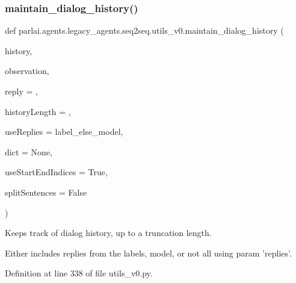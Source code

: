 \subsubsection{\texorpdfstring{maintain\+\_\+dialog\+\_\+history()}{maintain\_dialog\_history()}}
{\footnotesize\ttfamily def parlai.\+agents.\+legacy\+\_\+agents.\+seq2seq.\+utils\+\_\+v0.\+maintain\+\_\+dialog\+\_\+history (\begin{DoxyParamCaption}\item[{}]{history,  }\item[{}]{observation,  }\item[{}]{reply = {\ttfamily \textquotesingle{}\textquotesingle{}},  }\item[{}]{history\+Length = {},  }\item[{}]{use\+Replies = {\ttfamily \textquotesingle{}label\+\_\+else\+\_\+model\textquotesingle{}},  }\item[{}]{dict = {\ttfamily None},  }\item[{}]{use\+Start\+End\+Indices = {\ttfamily True},  }\item[{}]{split\+Sentences = {\ttfamily False} }\end{DoxyParamCaption})}

\begin{DoxyVerb}Keeps track of dialog history, up to a truncation length.

Either includes replies from the labels, model, or not all using param 'replies'.
\end{DoxyVerb}
 

Definition at line 338 of file utils\+\_\+v0.\+py.


